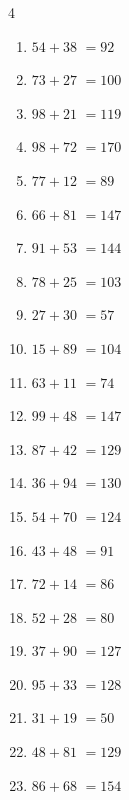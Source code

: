 \begin{multicols}{4}
\begin{enumerate}
  \item $54+38$
        $=92$

  \item $73+27$
        $=100$

  \item $98+21$
        $=119$

  \item $98+72$
        $=170$

  \item $77+12$
        $=89$

  \item $66+81$
        $=147$

  \item $91+53$
        $=144$

  \item $78+25$
        $=103$

  \item $27+30$
        $=57$

  \item $15+89$
        $=104$

  \item $63+11$
        $=74$

  \item $99+48$
        $=147$

\columnbreak %

\resetques

  \item $87+42$
        $=129$

  \item $36+94$
        $=130$

  \item $54+70$
        $=124$

  \item $43+48$
        $=91$

  \item $72+14$
        $=86$

  \item $52+28$
        $=80$

  \item $37+90$
        $=127$

  \item $95+33$
        $=128$

  \item $31+19$
        $=50$

  \item $48+81$
        $=129$

  \item $86+68$
        $=154$


\end{enumerate}
\end{multicols}
